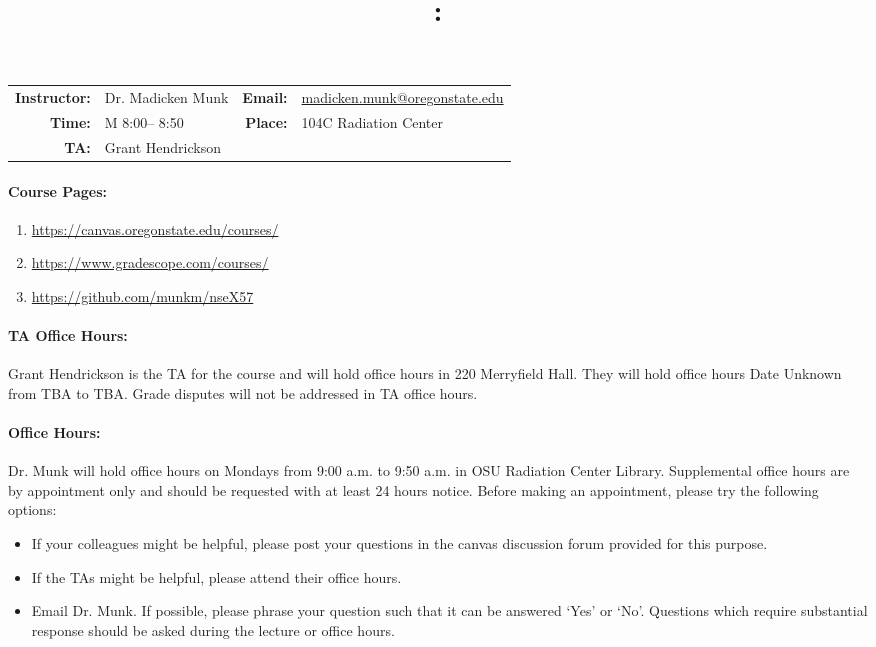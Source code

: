 \documentclass[11pt, a4paper]{article}
\title{\CourseNumber: \CourseTitle\\}
\author{\CourseUniversity}
\date{\CourseSemester \CourseYear}
\makeatletter
\newcommand{\CourseInstructor}{Dr. Madicken Munk\xspace}%
\newcommand{\CourseDays}{M\xspace}%
\newcommand{\CourseStart}{8:00\xspace}%
\newcommand{\CourseEnd}{8:50\xspace}%
\newcommand{\CourseInstructorEmail}{madicken.munk@oregonstate.edu}
\newcommand{\CourseRoom}{104C\xspace}%
\newcommand{\CourseBuilding}{Radiation Center\xspace}%
\newcommand{\TeachingAssistant}{Grant Hendrickson \xspace}%
\newcommand{\TAOfficeHourDays}{Date Unknown \xspace}%
\newcommand{\TAOfficeHourStart}{TBA\xspace}%
\newcommand{\TAOfficeHourEnd}{TBA\xspace}%
\newcommand{\TAOfficeHourPlace}{220 Merryfield Hall\xspace}
\newcommand{\MunkOfficeHourDays}{Mondays\xspace}%
\newcommand{\MunkOfficeHourStart}{9:00 a.m.\xspace}%
\newcommand{\MunkOfficeHourEnd}{9:50 a.m.\xspace}%
\newcommand{\MunkOfficeHourPlace}{OSU Radiation Center Library\xspace}
\makeatother
\begin{document}
\maketitle
\renewcommand{\arraystretch}{1.5}
\begin{center}
\begin{table}[h]
\begin{tabularx}{\textwidth}{rXrX}
\hline
\textbf{Instructor:} & \CourseInstructor & \textbf{Email:} & \href{mailto:\CourseInstructorEmail}{\CourseInstructorEmail} \\
\textbf{Time:} & \CourseDays \CourseStart -- \CourseEnd & \textbf{Place:} & \CourseRoom \CourseBuilding \\
\textbf{TA:} & \TeachingAssistant & & \\
\hline
\end{tabularx}
\end{table}
\end{center}

\paragraph{Course Pages:}
\begin{enumerate}
        \item \url{https://canvas.oregonstate.edu/courses/}
        \item \url{https://www.gradescope.com/courses/}
        \item \url{https://github.com/munkm/nseX57}
\end{enumerate}

\paragraph{TA Office Hours:} \TeachingAssistant is the TA for the course and will hold
office hours in \TAOfficeHourPlace.
They will hold office hours \TAOfficeHourDays from
\TAOfficeHourStart to \TAOfficeHourEnd.
Grade disputes will not be addressed in TA office hours.

\paragraph{Office Hours:} Dr. Munk  will hold office hours on
\MunkOfficeHourDays from \MunkOfficeHourStart to \MunkOfficeHourEnd in
\MunkOfficeHourPlace. Supplemental office hours are by appointment only
and should be requested with at least 24 hours notice.
Before making an appointment, please try the following options:
\begin{itemize}
\item If your colleagues might be helpful, please post your questions in the
        canvas discussion forum provided for this purpose.
\item If the TAs might be helpful, please attend their office hours.
\item Email Dr. Munk. If possible, please phrase your question such that it
        can be answered `Yes' or `No'.  Questions which require substantial
        response should be asked during the lecture or office hours.
\end{itemize}
\end{document}
